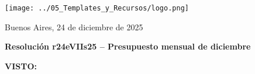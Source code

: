\documentclass[12pt]{article}
\begin{document}
\begin{minipage}{0.3\textwidth}
  \vspace{-0.6cm}
  \texttt{[image: ../05\_Templates\_y\_Recursos/logo.png]}
\end{minipage}
\hfill
\begin{minipage}{0.65\textwidth}
  \begin{flushright}
    Buenos Aires, 24 de diciembre de 2025
  \end{flushright}
\end{minipage}

\vspace{1cm}

\begin{center}
  \textbf{\large Resolución r24eVIIs25 – Presupuesto mensual de diciembre}
\end{center}

\vspace{0.8cm}

\textbf{VISTO:}


\vspace{0.4cm}
\end{document}
